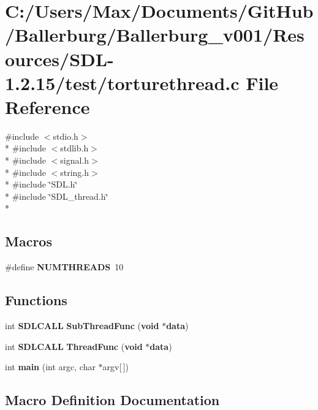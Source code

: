 \section{C\+:/\+Users/\+Max/\+Documents/\+Git\+Hub/\+Ballerburg/\+Ballerburg\+\_\+v001/\+Resources/\+S\+D\+L-\/1.2.15/test/torturethread.c File Reference}
\label{torturethread_8c}
{\ttfamily \#include $<$stdio.\+h$>$}\\*
{\ttfamily \#include $<$stdlib.\+h$>$}\\*
{\ttfamily \#include $<$signal.\+h$>$}\\*
{\ttfamily \#include $<$string.\+h$>$}\\*
{\ttfamily \#include \char`\"{}S\+D\+L.\+h\char`\"{}}\\*
{\ttfamily \#include \char`\"{}S\+D\+L\+\_\+thread.\+h\char`\"{}}\\*
\subsection*{Macros}
\begin{DoxyCompactItemize}
\item 
\#define {\bf N\+U\+M\+T\+H\+R\+E\+A\+D\+S}~10
\end{DoxyCompactItemize}
\subsection*{Functions}
\begin{DoxyCompactItemize}
\item 
int {\bf S\+D\+L\+C\+A\+L\+L} {\bf Sub\+Thread\+Func} ({\bf void} $\ast${\bf data})
\item 
int {\bf S\+D\+L\+C\+A\+L\+L} {\bf Thread\+Func} ({\bf void} $\ast${\bf data})
\item 
int {\bf main} (int argc, char $\ast$argv[$\,$])
\end{DoxyCompactItemize}


\subsection{Macro Definition Documentation}
